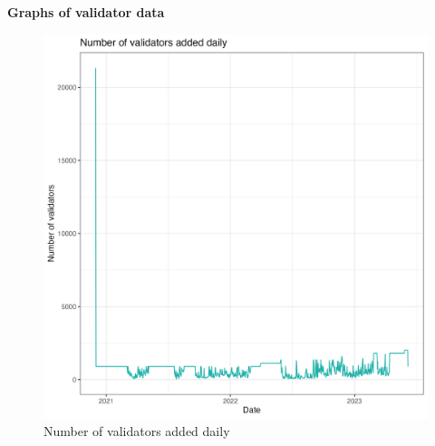 \documentclass[UTF8]{article}
\begin{document}
{\textbf{Graphs of validator data}
 \begin{figure}[htbp]
\begin{center}
\includegraphics[width=\linewidth]{images/daily_validator_plot_230607}             %
\caption{Number of validators added daily}
\label{fig:dailyvalidator1}
\end{center}
\end{figure} 

}
\end{document}
